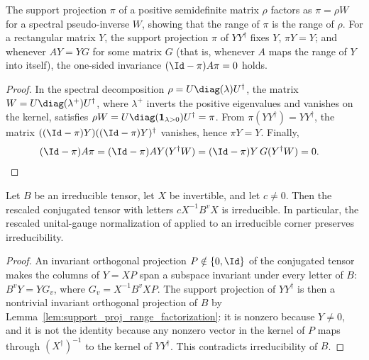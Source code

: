 \begin{lemma}
    \label{lem:support_proj_range_factorization}
    \leanok

    The support projection $\pi$ of a positive semidefinite matrix $\rho$
    factors as $\pi=\rho W$ for a spectral pseudo-inverse $W$, showing
    that the range of $\pi$ is the range of $\rho$. For a rectangular
    matrix $Y$, the support projection $\pi$ of $YY^\dagger$ fixes $Y$,
    $\pi Y=Y$; and whenever $AY=YG$ for some matrix $G$ (that is, whenever $A$
    maps the range of $Y$ into itself), the one-sided invariance
    $(\Id-\pi)A\pi=0$ holds.
\end{lemma}

\begin{proof}
    \leanok

    In the spectral decomposition $\rho=U\diag(\lambda)U^\dagger$, the matrix
    $W=U\diag(\lambda^{+})U^\dagger$, where $\lambda^{+}$ inverts the positive
    eigenvalues and vanishes on the kernel, satisfies
    $\rho W=U\diag(\mathbf{1}_{\lambda>0})U^\dagger=\pi$.
    From $\pi(YY^\dagger)=YY^\dagger$, the matrix
    $((\Id-\pi)Y)((\Id-\pi)Y)^\dagger$ vanishes, hence $\pi Y=Y$.
    Finally,
    \begin{align}
        (\Id-\pi)A\pi
         & =(\Id-\pi)AY(Y^\dagger W)
        =(\Id-\pi)Y\,G(Y^\dagger W)
        =0.
        \notag
    \end{align}
\end{proof}

\begin{lemma}
    \label{thm:irreducible_tensor_smul_conj}
    \leanok
    Let $B$ be an irreducible tensor, let $X$ be invertible, and let
    $c\ne0$. Then the rescaled conjugated tensor with letters
    $cX^{-1}B^vX$ is irreducible. In particular, the rescaled unital-gauge
    normalization of \cite[Section~2.3]{Cirac2016MPDO_arXiv} applied to an
    irreducible corner preserves irreducibility.
\end{lemma}

\begin{proof}
    \leanok
    An invariant orthogonal projection $P\notin\{0,\Id\}$ of the
    conjugated tensor makes the columns of $Y=XP$ span a subspace invariant
    under every letter of $B$: $B^vY=YG_v$, where
    $G_v=X^{-1}B^vXP$. The support projection of $YY^\dagger$ is then a
    nontrivial invariant orthogonal projection of $B$ by
    Lemma~\ref{lem:support_proj_range_factorization}: it is nonzero
    because $Y\ne0$, and it is not the identity because any nonzero
    vector in the kernel of $P$ maps through $(X^\dagger)^{-1}$ to
    the kernel of $YY^\dagger$. This contradicts irreducibility of $B$.
\end{proof}

